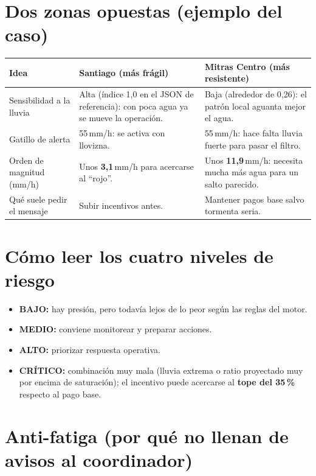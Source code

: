 \documentclass[11pt,a4paper]{article}
\begin{document}
\section*{Dos zonas opuestas (ejemplo del caso)}

\noindent
{\renewcommand{\arraystretch}{1.15}%
\begin{tabularx}{\textwidth}{@{}>{\raggedright\arraybackslash}p{3.6cm} >{\raggedright\arraybackslash}X >{\raggedright\arraybackslash}X@{}}
\toprule
\textbf{Idea} & \textbf{Santiago (más frágil)} & \textbf{Mitras Centro (más resistente)} \\
\midrule
Sensibilidad a la lluvia & Alta (índice 1{,}0 en el JSON de referencia): con poca agua ya se mueve la operación. & Baja (alrededor de 0{,}26): el patrón local aguanta mejor el agua. \\
Gatillo de alerta & 0{,}55\,mm/h: se activa con llovizna. & 6{,}55\,mm/h: hace falta lluvia fuerte para pasar el filtro. \\
Orden de magnitud (mm/h) & Unos \textbf{3{,}1}\,mm/h para acercarse al ``rojo''. & Unos \textbf{11{,}9}\,mm/h: necesita mucha más agua para un salto parecido. \\
Qué suele pedir el mensaje & Subir incentivos antes. & Mantener pagos base salvo tormenta seria. \\
\bottomrule
\end{tabularx}%
}

\section*{Cómo leer los cuatro niveles de riesgo}

\begin{itemize}
  \item \textbf{BAJO:} hay presión, pero todavía lejos de lo peor según las reglas del motor.
  \item \textbf{MEDIO:} conviene monitorear y preparar acciones.
  \item \textbf{ALTO:} priorizar respuesta operativa.
  \item \textbf{CRÍTICO:} combinación muy mala (lluvia extrema o ratio proyectado muy por encima de saturación); el incentivo puede acercarse al \textbf{tope del 35\,\%} respecto al pago base.
\end{itemize}

\section*{Anti-fatiga (por qué no llenan de avisos al coordinador)}
\end{document}
